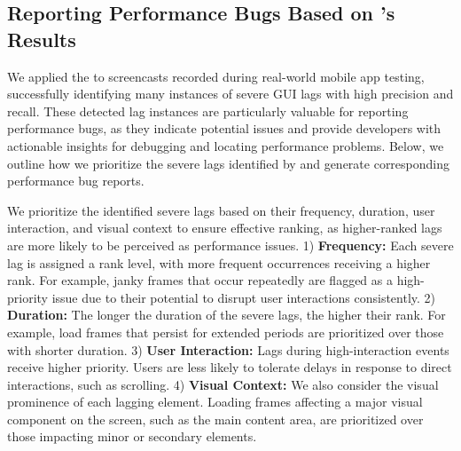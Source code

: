 \subsection{Reporting Performance Bugs Based on \tool's Results}
We applied the \tool to screencasts recorded during real-world mobile app testing, successfully identifying many instances of severe GUI lags with high precision and recall. 
These detected lag instances are particularly valuable for reporting performance bugs, as they indicate potential issues and provide developers with actionable insights for debugging and locating performance problems. Below, we outline how we prioritize the severe lags identified by \tool and generate corresponding performance bug reports. %


We prioritize the identified severe lags based on their frequency, duration, user interaction, and visual context to ensure effective ranking, as higher-ranked lags are more likely to be perceived as performance issues. 1) \textbf{Frequency:} Each severe lag is assigned a rank level, with more frequent occurrences receiving a higher rank. For example, janky frames that occur repeatedly are flagged as a high-priority issue due to their potential to disrupt user interactions consistently. 2) \textbf{Duration:} The longer the duration of the severe lags, the higher their rank. For example, load frames that persist for extended periods are prioritized over those with shorter duration. 3) \textbf{User Interaction:} Lags during high-interaction events receive higher priority. Users are less likely to tolerate delays in response to direct interactions, such as scrolling. 
4) \textbf{Visual Context:} We also consider the visual prominence of each lagging element. Loading frames affecting a major visual component on the screen, such as the main content area, are prioritized over those impacting minor or secondary elements. 

